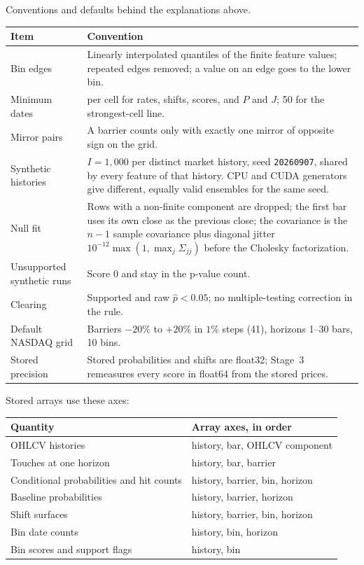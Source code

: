 \documentclass[11pt]{article}
\renewcommand{\arraystretch}{1.15}
\begin{document}
Conventions and defaults behind the explanations above.
\begin{center}
\renewcommand{\arraystretch}{1.3}
\begin{tabularx}{\linewidth}{@{}l >{\raggedright\arraybackslash}X@{}}
\toprule
\rowcolor{ConceptPaper}
\textbf{Item} & \textbf{Convention} \\
\midrule
Bin edges & Linearly interpolated quantiles of the finite feature values; repeated edges removed; a value on an edge goes to the lower bin. \\
Minimum dates & 30 per cell for rates, shifts, scores, and $P$ and $J$; 50 for the strongest-cell line. \\
Mirror pairs & A barrier counts only with exactly one mirror of opposite sign on the grid. \\
Synthetic histories & $I=1{,}000$ per distinct market history, seed \texttt{20260907}, shared by every feature of that history. CPU and CUDA generators give different, equally valid ensembles for the same seed. \\
Null fit & Rows with a non-finite component are dropped; the first bar uses its own close as the previous close; the covariance is the $n-1$ sample covariance plus diagonal jitter $10^{-12}\max(1,\max_j\Sigma_{jj})$ before the Cholesky factorization. \\
Unsupported synthetic runs & Score $0$ and stay in the p-value count. \\
Clearing & Supported and raw $\widehat p<0.05$; no multiple-testing correction in the rule. \\
Default NASDAQ grid & Barriers $-20\%$ to $+20\%$ in $1\%$ steps (41), horizons 1--30 bars, 10 bins. \\
Stored precision & Stored probabilities and shifts are float32; Stage~3 remeasures every score in float64 from the stored prices. \\
\bottomrule
\end{tabularx}
\end{center}

Stored arrays use these axes:
\begin{center}
\begin{tabular}{ll}
\toprule
\rowcolor{ConceptPaper}
\textbf{Quantity} & \textbf{Array axes, in order} \\
\midrule
OHLCV histories & history, bar, OHLCV component \\
Touches at one horizon & history, bar, barrier \\
Conditional probabilities and hit counts & history, barrier, bin, horizon \\
Baseline probabilities & history, barrier, horizon \\
Shift surfaces & history, barrier, bin, horizon \\
Bin date counts & history, bin, horizon \\
Bin scores and support flags & history, bin \\
\bottomrule
\end{tabular}
\end{center}
\end{document}
